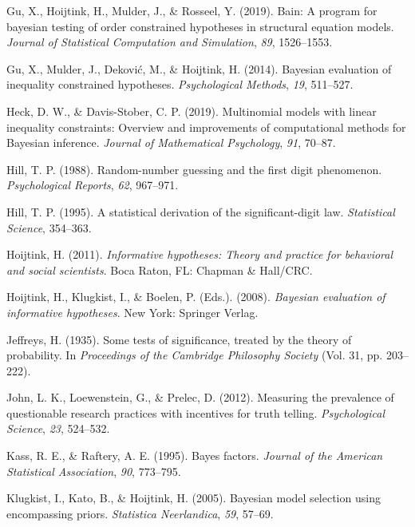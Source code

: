 \documentclass[
  english,
  man,floatsintext]{apa6}
\newlength{\cslhangindent}
\newenvironment{cslreferences}%
  {\setlength{\parindent}{0pt}%
  \everypar{\setlength{\hangindent}{\cslhangindent}}\ignorespaces}%
  {\par}
\begin{document}
\begin{cslreferences}
\leavevmode\hypertarget{ref-gu2019bain}{}%
Gu, X., Hoijtink, H., Mulder, J., \& Rosseel, Y. (2019). Bain: A program for bayesian testing of order constrained hypotheses in structural equation models. \emph{Journal of Statistical Computation and Simulation}, \emph{89}, 1526--1553.

\leavevmode\hypertarget{ref-gu2014bayesian}{}%
Gu, X., Mulder, J., Deković, M., \& Hoijtink, H. (2014). Bayesian evaluation of inequality constrained hypotheses. \emph{Psychological Methods}, \emph{19}, 511--527.

\leavevmode\hypertarget{ref-heck2019multinomial}{}%
Heck, D. W., \& Davis-Stober, C. P. (2019). Multinomial models with linear inequality constraints: Overview and improvements of computational methods for Bayesian inference. \emph{Journal of Mathematical Psychology}, \emph{91}, 70--87.

\leavevmode\hypertarget{ref-hill1988random}{}%
Hill, T. P. (1988). Random-number guessing and the first digit phenomenon. \emph{Psychological Reports}, \emph{62}, 967--971.

\leavevmode\hypertarget{ref-hill1995statistical}{}%
Hill, T. P. (1995). A statistical derivation of the significant-digit law. \emph{Statistical Science}, 354--363.

\leavevmode\hypertarget{ref-hoijtink2011informative}{}%
Hoijtink, H. (2011). \emph{Informative hypotheses: Theory and practice for behavioral and social scientists}. Boca Raton, FL: Chapman \& Hall/CRC.

\leavevmode\hypertarget{ref-hoijtink2008bayesian}{}%
Hoijtink, H., Klugkist, I., \& Boelen, P. (Eds.). (2008). \emph{Bayesian evaluation of informative hypotheses}. New York: Springer Verlag.

\leavevmode\hypertarget{ref-jeffreys1935some}{}%
Jeffreys, H. (1935). Some tests of significance, treated by the theory of probability. In \emph{Proceedings of the Cambridge Philosophy Society} (Vol. 31, pp. 203--222).

\leavevmode\hypertarget{ref-john2012measuring}{}%
John, L. K., Loewenstein, G., \& Prelec, D. (2012). Measuring the prevalence of questionable research practices with incentives for truth telling. \emph{Psychological Science}, \emph{23}, 524--532.

\leavevmode\hypertarget{ref-kass1995bayes}{}%
Kass, R. E., \& Raftery, A. E. (1995). Bayes factors. \emph{Journal of the American Statistical Association}, \emph{90}, 773--795.

\leavevmode\hypertarget{ref-klugkist2005bayesian}{}%
Klugkist, I., Kato, B., \& Hoijtink, H. (2005). Bayesian model selection using encompassing priors. \emph{Statistica Neerlandica}, \emph{59}, 57--69.


\end{cslreferences}
\end{document}
